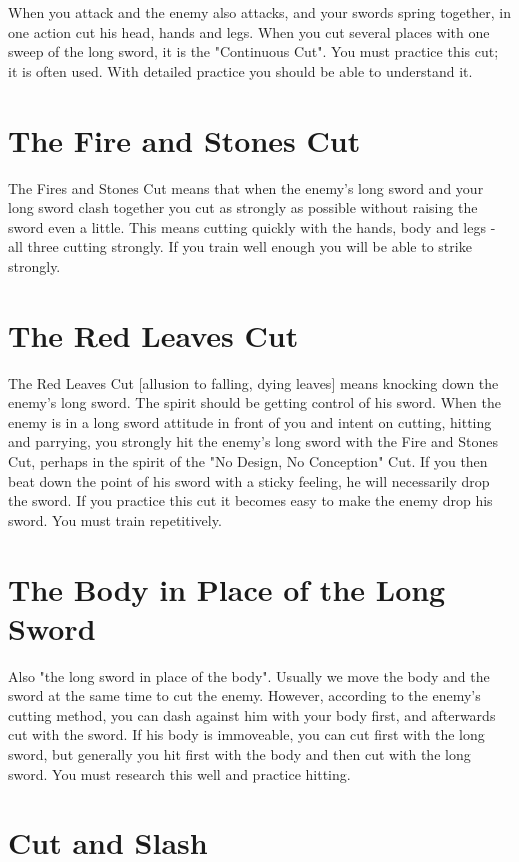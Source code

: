 When you attack and the enemy also attacks, and your swords spring together, in one action cut his head, hands and legs. When you cut several places with one sweep of the long sword, it is the "Continuous Cut". You must practice this cut; it is often used. With detailed practice you should be able to understand it.\\
\section{The Fire and Stones Cut}

The Fires and Stones Cut means that when the enemy's long sword and your long sword clash together you cut as strongly as possible without raising the sword even a little. This means cutting quickly with the hands, body and legs - all three cutting strongly. If you train well enough you will be able to strike strongly.\\
\section{The Red Leaves Cut}

The Red Leaves Cut [allusion to falling, dying leaves] means knocking down the enemy's long sword. The spirit should be getting control of his sword. When the enemy is in a long sword attitude in front of you and intent on cutting, hitting and parrying, you strongly hit the enemy's long sword with the Fire and Stones Cut, perhaps in the spirit of the "No Design, No Conception" Cut. If you then beat down the point of his sword with a sticky feeling, he will necessarily drop the sword. If you practice this cut it becomes easy to make the enemy drop his sword. You must train repetitively.\\
\section{The Body in Place of the Long Sword}

Also "the long sword in place of the body". Usually we move the body and the sword at the same time to cut the enemy. However, according to the enemy's cutting method, you can dash against him with your body first, and afterwards cut with the sword. If his body is immoveable, you can cut first with the long sword, but generally you hit first with the body and then cut with the long sword. You must research this well and practice hitting.\\
\section{Cut and Slash}

